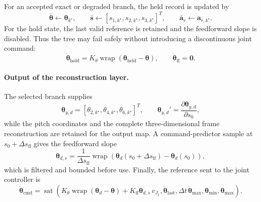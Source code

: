 \documentclass[12pt,a4paper]{report}
\begin{document}
For an accepted exact or degraded branch, the held record is updated by
\begin{equation}
\bar{\boldsymbol{\theta}}\leftarrow\boldsymbol{\theta}_{k^\star},\qquad
\bar{\mathbf{s}}\leftarrow
[s_{1,k^\star},s_{2,k^\star},s_{3,k^\star}]^T,\qquad
\bar{\mathbf{a}}_r\leftarrow\mathbf{a}_{r,k^\star}.
\tag{8.121}
\label{eq:ch8-held-reference-update}
\end{equation}
For the hold state, the last valid reference is retained and the feedforward
slope is disabled. Thus the tree may fail safely without introducing a
discontinuous joint command:
\begin{equation}
\dot{\boldsymbol{\theta}}_{\mathrm{hold}}
=K_\theta\operatorname{wrap}
(\boldsymbol{\theta}_{\mathrm{held}}-\boldsymbol{\theta}),
\qquad
\dot{\boldsymbol{\theta}}_{\mathrm{ff}}=\mathbf{0}.
\tag{8.122}
\label{eq:ch8-hold-command}
\end{equation}

\paragraph{Output of the reconstruction layer.}
The selected branch supplies
\begin{equation}
\boldsymbol{\theta}_{y,d}
=
[\theta_{2,k^\star},\theta_{4,k^\star},\theta_{6,k^\star}]^T,
\qquad
\boldsymbol{\theta}_{y,d}'=
\frac{\partial\boldsymbol{\theta}_{y,d}}{\partial s_0},
\tag{8.123}
\label{eq:ch8-tree-output}
\end{equation}
while the pitch coordinates and the complete three-dimensional frame
reconstruction are retained for the output map. A command-predictor sample
at $s_0+\Delta s_{\mathrm{ff}}$ gives the feedforward slope
\begin{equation}
\boldsymbol{\theta}_{d,s}
=\frac{1}{\Delta s_{\mathrm{ff}}}
\operatorname{wrap}\!\left(
\boldsymbol{\theta}_{d}(s_0+\Delta s_{\mathrm{ff}})
-\boldsymbol{\theta}_{d}(s_0)\right),
\tag{8.124}
\label{eq:ch8-feedforward-slope}
\end{equation}
which is filtered and bounded before use. Finally, the reference sent to the
joint controller is
\begin{equation}
\dot{\boldsymbol{\theta}}_{\mathrm{cmd}}
=\operatorname{sat}\!\left(
K_\theta\operatorname{wrap}(\boldsymbol{\theta}_d-\boldsymbol{\theta})
+K_{\mathrm{ff}}\boldsymbol{\theta}_{d,s}\,v_{J_1},
\dot{\boldsymbol{\theta}}_{\mathrm{last}},
\Delta t\,\dot{\boldsymbol{\theta}}_{\max},
\boldsymbol{\theta}_{\min},\boldsymbol{\theta}_{\max}\right).
\tag{8.125}
\label{eq:ch8-tree-joint-command}
\end{equation}
\end{document}
